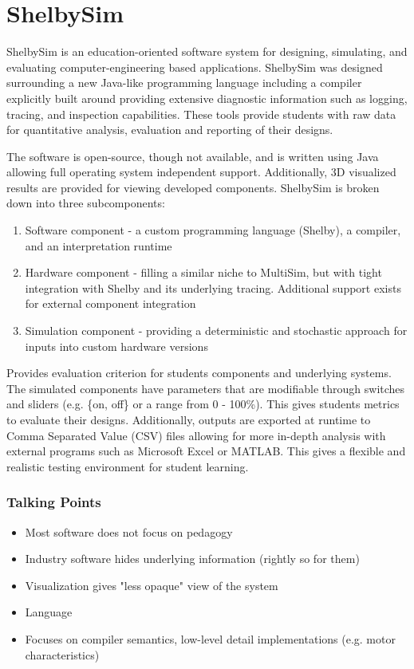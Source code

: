 \section{ShelbySim \cite{Tappan2009}}

ShelbySim is an education-oriented software system for designing, simulating, and evaluating computer-engineering based applications. ShelbySim was designed surrounding a new Java-like programming language including a compiler explicitly built around providing extensive diagnostic information such as logging, tracing, and inspection capabilities. These tools provide students with raw data for quantitative analysis, evaluation and reporting of their designs. 

The software is open-source, though not available, and is written using Java allowing full operating system independent support. Additionally, 3D visualized results are provided for viewing developed components. ShelbySim is broken down into three subcomponents:
\begin{enumerate}
\item Software component - a custom programming language (Shelby), a compiler, and an interpretation runtime
\item Hardware component - filling a similar niche to MultiSim, but with tight integration with Shelby and its underlying tracing. Additional support exists for external component integration
\item Simulation component - providing a deterministic and stochastic approach for inputs into custom hardware versions
\end{enumerate} 

Provides evaluation criterion for students components and underlying systems. The simulated components have parameters that are modifiable through switches and sliders (e.g. \{on, off\} or a range from 0 - 100\%). This gives students metrics to evaluate their designs. Additionally, outputs are exported at runtime to Comma Separated Value (CSV) files allowing for more in-depth analysis with external programs such as Microsoft Excel or MATLAB. This gives a flexible and realistic testing environment for student learning. 

\subsubsection{Talking Points}

\begin{itemize}
\item Most software does not focus on pedagogy
\item Industry software hides underlying information (rightly so for them)
\item Visualization gives "less opaque" view of the system
\item Language 
\item Focuses on compiler semantics, low-level detail implementations (e.g. motor characteristics)
\end{itemize}

